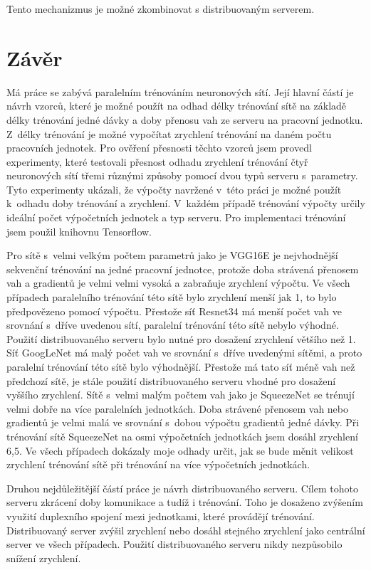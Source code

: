 Tento mechanizmus je možné zkombinovat s distribuovaným serverem.


\chapter{Závěr}
\label{chap:conc}

Má práce se zabývá paralelním trénováním neuronových sítí.
Její hlavní částí je návrh vzorců, které je možné použít na odhad délky trénování sítě na základě délky trénování jedné dávky a doby přenosu vah ze serveru na pracovní jednotku.
Z~délky trénování je možné vypočítat zrychlení trénování na daném počtu pracovních jednotek.
Pro ověření přesnosti těchto vzorců jsem provedl experimenty, které testovali přesnost odhadu zrychlení trénování čtyř neuronových sítí třemi různými způsoby pomocí dvou typů serveru s~parametry.
Tyto experimenty ukázali, že výpočty navržené v~této práci je možné použít k~odhadu doby trénování a zrychlení.
V~každém případě trénování výpočty určily ideální počet výpočetních jednotek a typ serveru.
Pro implementaci trénování jsem použil knihovnu Tensorflow. 

Pro sítě s~velmi velkým počtem parametrů jako je VGG16E je nejvhodnější sekvenční trénování na jedné pracovní jednotce, protože doba strávená přenosem vah a gradientů je velmi velmi vysoká a zabraňuje zrychlení výpočtu.
Ve všech případech paralelního trénování této sítě bylo zrychlení menší jak 1, to bylo předpovězeno pomocí výpočtu.
Přestože síť Resnet34 má menší počet vah ve srovnání s~dříve uvedenou sítí, paralelní trénování této sítě nebylo výhodné.
Použití distribuovaného serveru bylo nutné pro dosažení zrychlení většího než 1.
Síť GoogLeNet má malý počet vah ve srovnání s~dříve uvedenými sítěmi, a proto paralelní trénování této sítě bylo výhodnější.
Přestože má tato síť méně vah než předchozí sítě, je stále použití distribuovaného serveru vhodné pro dosažení vyššího zrychlení.
Sítě s~velmi malým počtem vah jako je SqueezeNet se trénují velmi dobře na více paralelních jednotkách.
Doba strávené přenosem vah nebo gradientů je velmi malá ve srovnání s~dobou výpočtu gradientů jedné dávky.
Při trénování sítě SqueezeNet na osmi výpočetních jednotkách jsem dosáhl zrychlení 6,5.
Ve všech případech dokázaly moje odhady určit, jak se bude měnit velikost zrychlení trénování sítě při trénování na více výpočetních jednotkách.

Druhou nejdůležitější částí práce je návrh distribuovaného serveru.
Cílem tohoto serveru zkrácení doby komunikace a tudíž i trénování.
Toho je dosaženo zvýšením využití duplexního spojení mezi jednotkami, které provádějí trénování.
Distribuovaný server zvýšil zrychlení nebo dosáhl stejného zrychlení jako centrální server ve všech případech.
Použití distribuovaného serveru nikdy nezpůsobilo snížení zrychlení.

